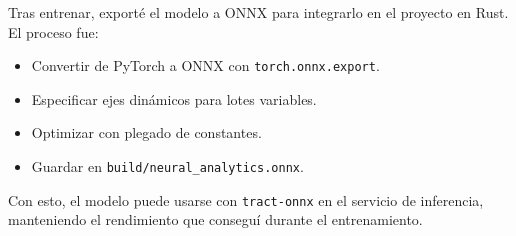 Tras entrenar, exporté el modelo a ONNX para integrarlo en el proyecto en Rust. El proceso fue:

\begin{itemize}
    \item Convertir de PyTorch a ONNX con \texttt{torch.onnx.export}.
    \item Especificar ejes dinámicos para lotes variables.
    \item Optimizar con plegado de constantes.
    \item Guardar en \texttt{build/neural\_analytics.onnx}.
\end{itemize}

Con esto, el modelo puede usarse con \texttt{tract-onnx} en el servicio de inferencia, manteniendo el rendimiento que conseguí durante el entrenamiento.
